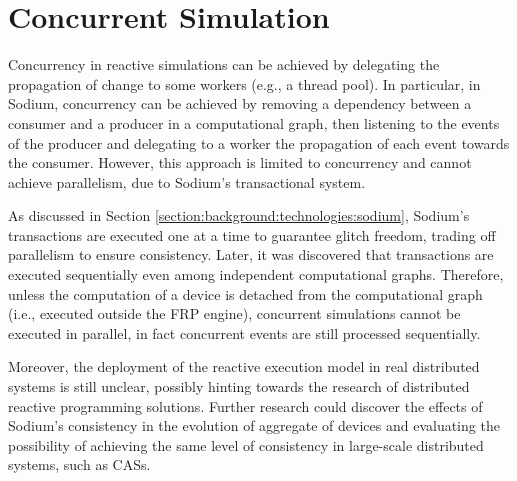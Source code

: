 
\section{Concurrent Simulation}
\label{section:design:concurrent-simulation}

Concurrency in reactive simulations can be achieved by delegating the
propagation of change to some workers (e.g., a thread pool). In particular, in
Sodium, concurrency can be achieved by removing a dependency between a consumer
and a producer in a computational graph, then listening to the events of the
producer and delegating to a worker the propagation of each event towards the
consumer. However, this approach is limited to concurrency and cannot achieve
parallelism, due to Sodium's transactional system.

As discussed in Section \ref{section:background:technologies:sodium}, Sodium's
transactions are executed one at a time to guarantee glitch freedom, trading
off parallelism to ensure consistency. Later, it was discovered that
transactions are executed sequentially even among independent computational
graphs. Therefore, unless the computation of a device is detached from the
computational graph (i.e., executed outside the FRP engine), concurrent
simulations cannot be executed in parallel, in fact concurrent events are still
processed sequentially.

Moreover, the deployment of the reactive execution model in real distributed
systems is still unclear, possibly hinting towards the research of distributed
reactive programming solutions. Further research could discover the effects of
Sodium's consistency in the evolution of aggregate of devices and evaluating
the possibility of achieving the same level of consistency in large-scale
distributed systems, such as \ac{CAS}s.
